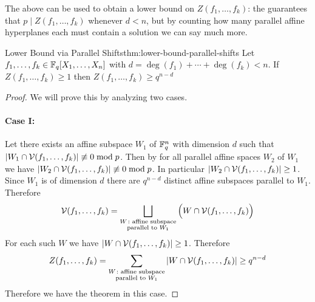 The \AffSubspaceShiftlem above can be used to obtain a lower bound on $Z(f_1,\dots,f_k)$: the \CWthm guarantees that $p\mid Z(f_1,\dots,f_k)$ whenever $d<n$, but by counting how many parallel affine hyperplanes each must contain a solution we can say much more.
\begin{Theorem}{Lower Bound via Parallel Shifts}{thm:lower-bound-parallel-shifts}
  Let $f_1,\dots, f_k\in\mathbb{F}_q[X_1,\dots, X_n]$ with $d=\deg(f_1)+\cdots+\deg(f_k)<n$. If $Z(f_1,\dots, f_k)\geq 1$ then $Z(f_1,\dots, f_k)\geq q^{n-d}$
\end{Theorem}
\begin{proof}
  We will prove this by analyzing two cases. 
  \paragraph*{Case I:} Let there exists an affine subspace $W_1$ of $\mathbb{F}_q^n$ with dimension $d$ such that $|W_1\cap \mathcal{V}(f_1,\dots, f_k)|\not\equiv 0\bmod p$. Then by \AffSubspaceShiftlem for all parallel affine spaces $W_2$ of $W_1$ we have $|W_2\cap \mathcal{V}(f_1,\dots,f_k)|\not\equiv 0\bmod p$. In particular $|W_2\cap \mathcal{V}(f_1,\dots, f_k)|\geq 1$. Since $W_1$ is of dimension $d$ there are $q^{n-d}$ distinct affine subspaces parallel to $W_1$. Therefore 
  $$\mathcal{V}(f_1,\dots, f_k)=\bigsqcup_{\substack{W\colon\text{affine subspace}\\ \text{parallel to $W_1$}}}\Big(W\cap \mathcal{V}(f_1,\dots,f_k)\Big)$$
  For each such $W$ we have $|W\cap\mathcal{V}(f_1,\dots,f_k)|\geq 1$. Therefore 
  $$Z(f_1,\dots, f_k)=\sum_{\substack{W\colon\text{affine subspace}\\ \text{parallel to $W_1$}}}|W\cap\mathcal{V}(f_1,\dots,f_k)|\geq q^{n-d}$$
  Therefore we have the theorem in this case. 

\end{proof}
